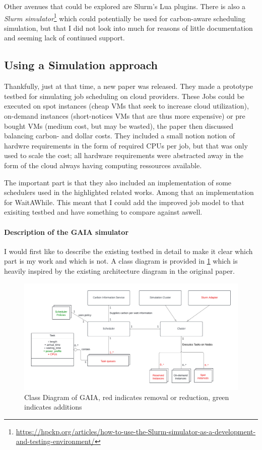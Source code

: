 Other avenues that could be explored are Slurm's Lua plugins. There is also a \emph{Slurm simulator}\footnote{\url{https://hpckp.org/articles/how-to-use-the-Slurm-simulator-as-a-development-and-testing-environment/}} which could potentially be used for carbon-aware scheduling simulation, but that I did not look into much for reasons of little documentation and seeming lack of continued support.

\subsection{Using a Simulation approach}

Thankfully, just at that time, a new paper \cite{hanafy_going_2024} was released. 
They made a prototype testbed for simulating job scheduling on cloud providers. These Jobs could be executed on spot instances (cheap VMs that seek to increase cloud utilization), on-demand instances (short-notices VMs that are thus more expensive) or pre bought VMs (medium cost, but may be wasted), the paper then discussed balancing carbon- and dollar costs. 
They included a small notion notion of hardwre requirements in the form of required CPUs per job, but that was only used to scale the cost; all hardware requirements were abstracted away in the form of the cloud always having computing ressources available.

The important part is that they also included an implementation of some schedulers used in the highlighted related works. Among that an implementation for WaitAWhile\cite{wiesner_lets_2021}.
This meant that I could add the improved job model to that exisiting testbed and have something to compare against aswell.

\paragraph{Description of the GAIA simulator}

I would first like to describe the existing testbed in detail to make it clear which part is my work and which is not. A class diagram is provided in \ref{fig:class_diagram} which is heavily inspired by the existing architecture diagram in the original paper. 

\begin{figure}
    \includegraphics[width=\linewidth]{images/MA Thesis Diagram.pdf}
    \caption{Class Diagram of GAIA, red indicates removal or reduction, green indicates additions}
    \label{fig:class_diagram}
\end{figure}


